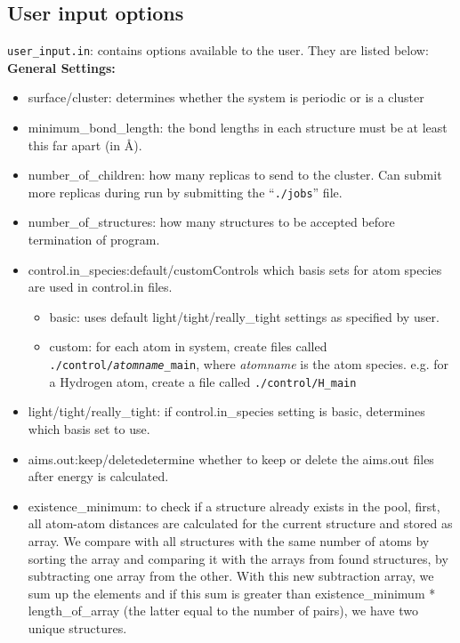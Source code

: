 \subsection{User input options}

\texttt{user\_input.in}: contains options available to the user. They are listed below:
\newline
\newline
\textbf{General Settings:}
\begin{itemize}
\item surface/cluster: determines whether the system is periodic or is a cluster

\item minimum\_bond\_length: the bond lengths in each structure must be at least this far apart (in \AA).

\item number\_of\_children: how many replicas to send to the cluster. Can submit more replicas during run by submitting the ``\texttt{./jobs}'' file.

\item number\_of\_structures: how many structures to be accepted before termination of program.

\item control.in\_species:default/custom\newline Controls which basis sets for atom species are used in control.in files.
\begin{itemize}
 \item basic: uses default light/tight/really\_tight settings as specified by user.
 \item custom: for each atom in system, create files called \texttt{./control/{\em atomname}\_main}, where {\em atomname} is the atom species.\newline
 e.g. for a Hydrogen atom, create a file called \texttt{./control/H\_main}
\end{itemize}

\item light/tight/really\_tight: if control.in\_species setting is basic, determines which basis set to use.

\item aims.out:keep/delete\newline determine whether to keep or delete the aims.out files after energy is calculated.
 
\item existence\_minimum: to check if a structure already exists in the pool, first, all atom-atom distances are calculated for the current structure and stored as array.  We compare with all structures with the same number of atoms by sorting the array and comparing it with the arrays from found structures, by subtracting one array from the other. With this new subtraction array, we sum up the elements and if this sum is greater than existence\_minimum * length\_of\_array (the latter equal to the number of pairs), we have two unique structures.


\end{itemize}
